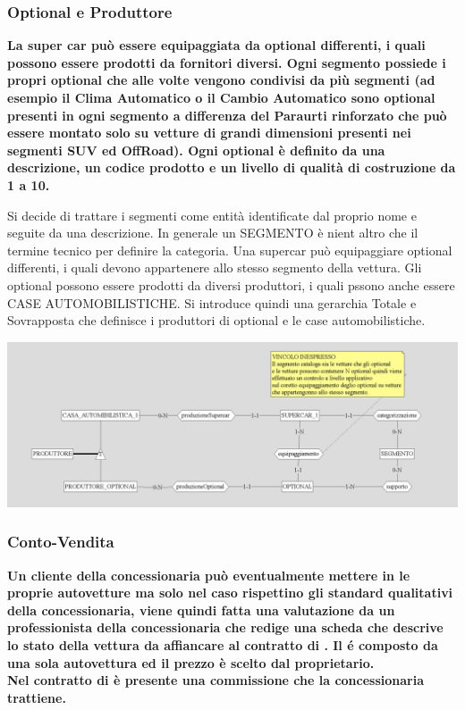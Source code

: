\documentclass[12pt]{article}
\begin{document}
\subsubsection{Optional e Produttore}
\textbf{La super car può essere equipaggiata da optional differenti, i quali
possono essere prodotti da fornitori diversi. Ogni segmento possiede i propri
optional che alle volte vengono condivisi da più segmenti (ad esempio il Clima
Automatico o il Cambio Automatico sono optional presenti in ogni segmento a
differenza del Paraurti rinforzato che può essere montato solo su vetture di
grandi dimensioni presenti nei segmenti SUV ed OffRoad). Ogni optional è
definito da una descrizione, un codice prodotto e un livello di qualità di
costruzione da 1 a 10.}

Si decide di trattare i segmenti come entità identificate dal proprio nome e
seguite da una descrizione. In generale un SEGMENTO è nient altro che il termine
tecnico per definire la categoria. Una supercar può equipaggiare optional
differenti, i quali devono appartenere allo stesso segmento della vettura. Gli
optional possono essere prodotti da diversi produttori, i quali pssono anche
essere CASE AUTOMOBILISTICHE. Si introduce quindi una gerarchia Totale e
Sovrapposta che definisce i produttori di optional e le case automobilistiche.

\begin{center}
    \includegraphics[width=\linewidth]{images/optional.png}
\end{center}

\subsubsection{Conto-Vendita}
\textbf{Un cliente della concessionaria può eventualmente mettere in
 le proprie autovetture ma solo nel caso rispettino
gli standard qualitativi della concessionaria, viene quindi fatta una
valutazione da un professionista della concessionaria che redige una scheda che
descrive lo stato della vettura da affiancare al contratto di
. Il  é composto da una
sola autovettura ed il prezzo è scelto dal proprietario.\\ 
Nel contratto di  è presente una commissione che la
concessionaria trattiene.}
\end{document}
